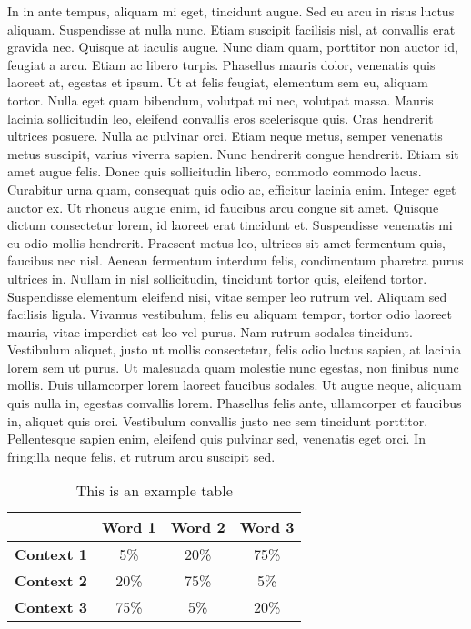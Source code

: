 \documentclass[12pt,a4paper]{article}
\begin{document}
In in ante tempus, aliquam mi eget, tincidunt augue. Sed eu arcu in risus luctus aliquam. Suspendisse at nulla nunc. Etiam suscipit facilisis nisl, at convallis erat gravida nec. Quisque at iaculis augue. Nunc diam quam, porttitor non auctor id, feugiat a arcu. Etiam ac libero turpis. Phasellus mauris dolor, venenatis quis laoreet at, egestas et ipsum. Ut at felis feugiat, elementum sem eu, aliquam tortor. Nulla eget quam bibendum, volutpat mi nec, volutpat massa. Mauris lacinia sollicitudin leo, eleifend convallis eros scelerisque quis. Cras hendrerit ultrices posuere. Nulla ac pulvinar orci. Etiam neque metus, semper venenatis metus suscipit, varius viverra sapien. Nunc hendrerit congue hendrerit. Etiam sit amet augue felis. Donec quis sollicitudin libero, commodo commodo lacus. Curabitur urna quam, consequat quis odio ac, efficitur lacinia enim. Integer eget auctor ex. Ut rhoncus augue enim, id faucibus arcu congue sit amet. Quisque dictum consectetur lorem, id laoreet erat tincidunt et. Suspendisse venenatis mi eu odio mollis hendrerit. Praesent metus leo, ultrices sit amet fermentum quis, faucibus nec nisl. Aenean fermentum interdum felis, condimentum pharetra purus ultrices in. Nullam in nisl sollicitudin, tincidunt tortor quis, eleifend tortor. Suspendisse elementum eleifend nisi, vitae semper leo rutrum vel. Aliquam sed facilisis ligula. Vivamus vestibulum, felis eu aliquam tempor, tortor odio laoreet mauris, vitae imperdiet est leo vel purus. Nam rutrum sodales tincidunt. Vestibulum aliquet, justo ut mollis consectetur, felis odio luctus sapien, at lacinia lorem sem ut purus. Ut malesuada quam molestie nunc egestas, non finibus nunc mollis. Duis ullamcorper lorem laoreet faucibus sodales. Ut augue neque, aliquam quis nulla in, egestas convallis lorem. Phasellus felis ante, ullamcorper et faucibus in, aliquet quis orci. Vestibulum convallis justo nec sem tincidunt porttitor. Pellentesque sapien enim, eleifend quis pulvinar sed, venenatis eget orci. In fringilla neque felis, et rutrum arcu suscipit sed.
\begin{table}[H]
\centering
\begin{tabular}{cccc}
\toprule
& \textbf{Word 1} & \textbf{Word 2} & \textbf{Word 3} \\
\midrule
\textbf{Context 1} & 5\% & 20\% & 75\% \\
\textbf{Context 2} & 20\% & 75\% & 5\% \\
\textbf{Context 3} & 75\% & 5\% & 20\% \\
\bottomrule
\end{tabular}
\caption{This is an example table}
\label{table}
\vspace{-1em}
\end{table}
\end{document}
